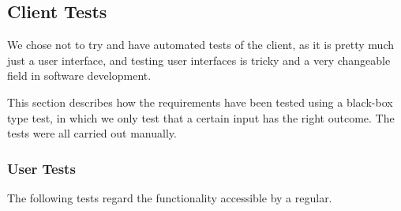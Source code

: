 \subsection{Client Tests}

We
chose not to try and have automated tests of the client, as it is pretty much
just a user interface, and testing user interfaces is tricky and a very
changeable field in software development.

This section describes how the requirements have been tested using a black-box type test, in which we only test that a certain input has the right outcome. The tests were all carried out manually.

\subsubsection{User Tests}
The following tests regard the functionality accessible by a regular. \\
